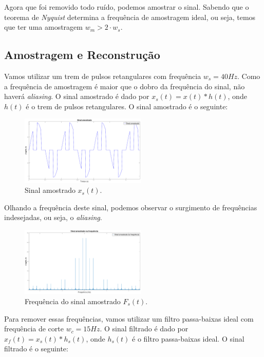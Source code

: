 \documentclass[journal]{IEEEtran}
\begin{document}
Agora que foi removido todo ruído, podemos amostrar o sinal. Sabendo que o teorema de \textit{Nyquist} determina a frequência de amostragem ideal, ou seja, temos que ter uma amostragem $w_{m} > 2\cdot w_{s}$.

\subsection{Amostragem e Reconstrução}

Vamos utilizar um trem de pulsos retangulares com frequência $w_s = 40Hz$. Como a frequência de amostragem é maior que o dobro da frequência do sinal, não haverá \textit{aliasing}. O sinal amostrado é dado por $x_s(t) = x(t) * h(t)$, onde $h(t)$ é o trem de pulsos retangulares. O sinal amostrado é o seguinte:

\begin{figure}[H]
\captionsetup{justification=centering}
\centering %
\includegraphics[width=6cm]{sinal_amostrado_40hz.png} %
\caption{Sinal amostrado $x_s(t)$.}
\end{figure}

Olhando a frequência deste sinal, podemos observar o surgimento de frequências indesejadas, ou seja, o \textit{aliasing}.

\begin{figure}[H]
\captionsetup{justification=centering}
\centering %
\includegraphics[width=6cm]{frequencia_sinal_amostrado_40Hz_3.png} %
\caption{Frequência do sinal amostrado $F_s(t)$.}
\end{figure}

Para remover essas frequências, vamos utilizar um filtro passa-baixas ideal com frequência de corte $w_c = 15Hz$. O sinal filtrado é dado por $x_f(t) = x_s(t) * h_s(t)$, onde $h_s(t)$ é o filtro passa-baixas ideal. O sinal filtrado é o seguinte:
\end{document}
